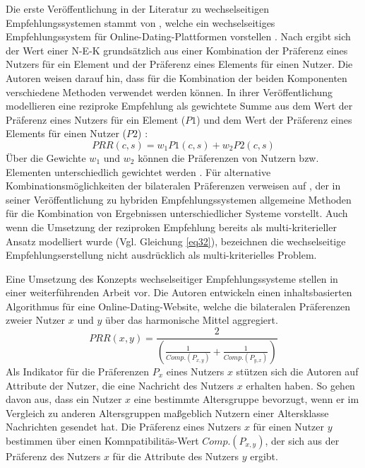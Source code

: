 Die erste Veröffentlichung in der Literatur zu wechselseitigen Empfehlungssystemen stammt von \textcite[S. 1ff.]{pizzato:inproceedings}, welche ein wechselseitiges Empfehlungssystem für Online-Dating-Plattformen vorstellen \cite[S. 1469]{yildirim:article}.
Nach \textcite[S. 5]{pizzato:inproceedings} ergibt sich der Wert einer \ac{N-E-K} grundsätzlich aus einer Kombination der Präferenz eines Nutzers für ein Element und der Präferenz eines Elements für einen Nutzer.
Die Autoren weisen darauf hin, dass für die Kombination der beiden Komponenten verschiedene Methoden verwendet werden können.
In ihrer Veröffentlichung modellieren \textcite[S. 6]{pizzato:inproceedings} eine reziproke Empfehlung als gewichtete Summe aus dem Wert der Präferenz eines Nutzers für ein Element ($P1$) und dem Wert der Präferenz eines Elements für einen Nutzer ($P2$) \cite[S. 6]{pizzato:inproceedings}:
\begin{equation}\label{eq32}
    PRR(c,s) = w_{1}P1(c,s) + w_{2}P2(c,s)
\end{equation}
Über die Gewichte $w_{1}$ und $w_{2}$ können die Präferenzen von Nutzern bzw. Elementen unterschiedlich gewichtet werden \cite[S. 6]{pizzato:inproceedings}.
Für alternative Kombinationsmöglichkeiten der bilateralen Präferenzen verweisen \textcite[S. 5]{pizzato:inproceedings} auf \textcite[S. 339ff.]{burke:article}, der in seiner Veröffentlichung zu hybriden Empfehlungssystemen allgemeine Methoden für die Kombination von Ergebnissen unterschiedlicher Systeme vorstellt.
Auch wenn die Umsetzung der reziproken Empfehlung bereits als multi-kriterieller Ansatz modelliert wurde (Vgl. Gleichung \ref{eq32}), bezeichnen \textcite[S. 1ff.]{pizzato:inproceedings} die wechselseitige Empfehlungserstellung nicht ausdrücklich als multi-kriterielles Problem. 

Eine Umsetzung des Konzepts wechselseitiger Empfehlungssysteme stellen \textcite[S. 207ff.]{pizzato:2010} in einer weiterführenden Arbeit vor.
Die Autoren entwickeln einen inhaltsbasierten Algorithmus für eine Online-Dating-Website, welche die bilateralen Präferenzen zweier Nutzer $x$ und $y$ über das harmonische Mittel aggregiert.
\begin{equation}\label{eq33}
    PRR(x,y) = \frac{2}{(\frac{1}{Comp.(P_{x,y})}+\frac{1}{Comp.(P_{y,x})})}
\end{equation}
Als Indikator für die Präferenzen $P_{x}$ eines Nutzers $x$ stützen sich die Autoren auf Attribute der Nutzer, die eine Nachricht des Nutzers $x$ erhalten haben.
So gehen \textcite[S. 210]{pizzato:2010} davon aus, dass ein Nutzer $x$ eine bestimmte Altersgruppe bevorzugt, wenn er im Vergleich zu anderen Altersgruppen maßgeblich Nutzern einer Altersklasse Nachrichten gesendet hat.
Die Präferenz eines Nutzers $x$ für einen Nutzer $y$ bestimmen \textcite[S. 210]{pizzato:2010} über einen Komnpatibilitäs-Wert $Comp.(P_{x,y})$, der sich aus der Präferenz des Nutzers $x$ für die Attribute des Nutzers $y$ ergibt.

